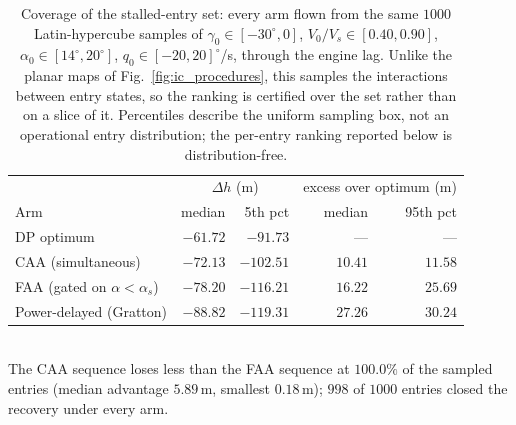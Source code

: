 \begin{table}[H]
    \centering
    \caption{Coverage of the stalled-entry set: every arm flown from
    the same $1000$ Latin-hypercube samples of
    $\gamma_0 \in [-30^\circ, 0]$, $V_0/V_s \in [0.40, 0.90]$,
    $\alpha_0 \in [14^\circ, 20^\circ]$, $q_0 \in [-20, 20]^\circ$/s,
    through the engine lag. Unlike the planar maps of
    Fig.~\ref{fig:ic_procedures}, this samples the interactions
    between entry states, so the ranking is certified over the set
    rather than on a slice of it. Percentiles describe the uniform
    sampling box, not an operational entry distribution; the
    per-entry ranking reported below is distribution-free.}
    \label{tab:montecarlo}
    \setlength{\tabcolsep}{14pt}\renewcommand{\arraystretch}{1.15}
    \begin{tabular}{lrrrr}
        \hline
        & \multicolumn{2}{c}{$\Delta h$ (m)} & \multicolumn{2}{c}{excess over optimum (m)} \\
        Arm & median & 5th pct & median & 95th pct \\
        \hline
        DP optimum & $-61.72$ & $-91.73$ & --- & --- \\
        CAA (simultaneous) & $-72.13$ & $-102.51$ & $10.41$ & $11.58$ \\
        FAA (gated on $\alpha < \alpha_s$) & $-78.20$ & $-116.21$ & $16.22$ & $25.69$ \\
        Power-delayed (Gratton) & $-88.82$ & $-119.31$ & $27.26$ & $30.24$ \\
        \hline
    \end{tabular}
    \\[2pt]
    \footnotesize The CAA sequence loses less than the FAA sequence at $100.0\%$ of the sampled entries (median advantage $5.89$\,m, smallest $0.18$\,m); $998$ of $1000$ entries closed the recovery under every arm.
\end{table}
